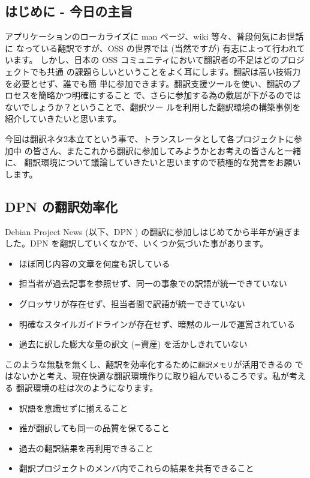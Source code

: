 \documentclass[mingoth,a4paper]{jsarticle}
\begin{document}
\clearpage

\subsection{はじめに - 今日の主旨}
アプリケーションのローカライズに man ページ、wiki 等々、普段何気にお世話に
なっている翻訳ですが、OSS の世界では (当然ですが) 有志によって行われています。
しかし、日本の OSS コミュニティにおいて翻訳者の不足はどのプロジェクトでも共通
の課題らしいということをよく耳にします。翻訳は高い技術力を必要とせず、誰でも簡
単に参加できます。翻訳支援ツールを使い、翻訳のプロセスを簡略かつ明確にすること
で、さらに参加する為の敷居が下がるのではないでしょうか？ということで、翻訳ツー
ルを利用した翻訳環境の構築事例を紹介していきたいと思います。

今回は翻訳ネタ2本立てという事で、トランスレータとして各プロジェクトに参加中
の皆さん、またこれから翻訳に参加してみようかとお考えの皆さんと一緒に、
翻訳環境について議論していきたいと思いますので積極的な発言をお願いします。

\subsection{DPN の翻訳効率化}
Debian Project News (以下、DPN ) の翻訳に参加しはじめてから半年が過ぎま
した。DPN を翻訳していくなかで、いくつか気づいた事があります。

\begin{itemize}
    \item ほぼ同じ内容の文章を何度も訳している
    \item 担当者が過去記事を参照せず、同一の事象での訳語が統一できていない
    \item グロッサリが存在せず、担当者間で訳語が統一できていない
    \item 明確なスタイルガイドラインが存在せず、暗黙のルールで運営されている
    \item 過去に訳した膨大な量の訳文 (=資産) を活かしきれていない
\end{itemize}

このような無駄を無くし、翻訳を効率化するために{\tt 翻訳メモリ}が活用できるの
ではないかと考え、現在快適な翻訳環境作りに取り組んでいるころです。私が考える
翻訳環境の柱は次のようになります。

\begin{itemize}
    \item 訳語を意識せずに揃えること
    \item 誰が翻訳しても同一の品質を保てること
    \item 過去の翻訳結果を再利用できること
    \item 翻訳プロジェクトのメンバ内でこれらの結果を共有できること
\end{itemize}
\end{document}
